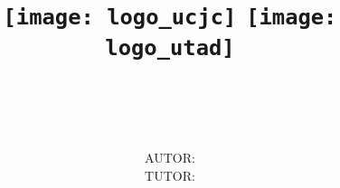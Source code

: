 \begin{titlepage}

    \title{
        \vspace{-1cm}
        \begin{figure}[H]
            \texttt{[image: logo\_ucjc]}\hfill%
            \texttt{[image: logo\_utad]}%
            \vspace{1cm}
        \end{figure}
        \vspace{4cm}
        \large \MakeUppercase{\utadcourse} \\
        \vspace{0.5cm}
        \Huge \MakeUppercase{\utadtitle}
        \vspace{4cm}
    }
    \author{
        AUTOR: \MakeUppercase{\utadstudent} \\
        TUTOR: \MakeUppercase{\utadtutor}
    }
    \maketitle
\end{titlepage}